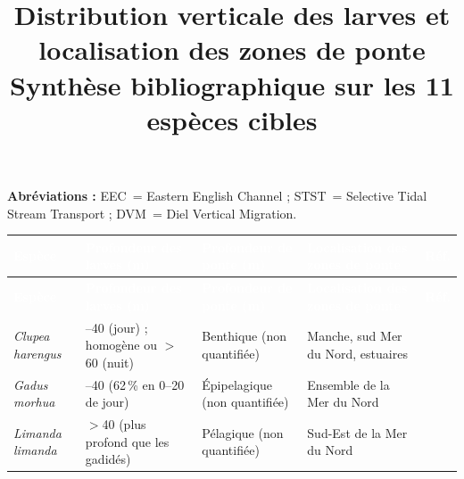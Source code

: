 \documentclass[a4paper,11pt]{article}
\title{\textbf{Distribution verticale des larves et localisation des zones de ponte}\\[4pt]
	\large Synthèse bibliographique sur les 11 espèces cibles}
\author{}
\date{}
\newcommand{\espece}[1]{\textit{#1}}
\begin{document}
	\maketitle
	\thispagestyle{empty}
	
	\setlength{\tabcolsep}{6pt}
	\renewcommand{\arraystretch}{1.5}
	
	\noindent\small
	\textbf{Abréviations :} EEC~= Eastern English Channel ;
	STST~= Selective Tidal Stream Transport ;
	DVM~= Diel Vertical Migration.
	
	\begin{longtable}{%
			>{\raggedright\arraybackslash}m{3.6cm}
			>{\raggedright\arraybackslash}m{5.2cm}
			>{\raggedright\arraybackslash}m{4.0cm}
			>{\raggedright\arraybackslash}m{8.0cm}
			>{\centering\arraybackslash}m{2.6cm}
		}
		
		\toprule
		\rowcolor{headerblue}
		\textcolor{white}{\textbf{Espèce}} &
		\textcolor{white}{\textbf{Profondeur des larves (m)}} &
		\textcolor{white}{\textbf{Profondeur de ponte (m)}} &
		\textcolor{white}{\textbf{Localisation des zones de ponte}} &
		\textcolor{white}{\textbf{Réf.}} \\
		\midrule
		\endfirsthead
		
		\toprule
		\rowcolor{headerblue}
		\textcolor{white}{\textbf{Espèce}} &
		\textcolor{white}{\textbf{Profondeur des larves (m)}} &
		\textcolor{white}{\textbf{Profondeur de ponte (m)}} &
		\textcolor{white}{\textbf{Localisation des zones de ponte}} &
		\textcolor{white}{\textbf{Réf.}} \\
		\midrule
		\endhead
		
		\midrule
		\endfoot
		
		\bottomrule
		\endlastfoot
		
		\rowcolor{white}
		\espece{Clupea harengus} &
		0--40 (jour) ; homogène ou $>$60 (nuit) &
		Benthique (non quantifiée) &
		Manche, sud Mer du Nord, estuaires &
		\textsuperscript{\cite{haslob_small_2009,hoffle_differences_2013,neven_winter_2024,ices_results_2007}} \\
		
		\rowcolor{rowgray}
		\espece{Gadus morhua} &
		0--40 (62\,\% en 0--20 de jour) &
		Épipelagique (non quantifiée) &
		Ensemble de la Mer du Nord &
		\textsuperscript{\cite{hoffle_differences_2013,ices_results_2007}} \\
		
		\rowcolor{white}
		\espece{Limanda limanda} &
		$>$40 (plus profond que les gadidés) &
		Pélagique (non quantifiée) &
		Sud-Est de la Mer du Nord &
		\textsuperscript{\cite{hoffle_differences_2013,ices_results_2007}} \\
		

\end{longtable}
\end{document}
